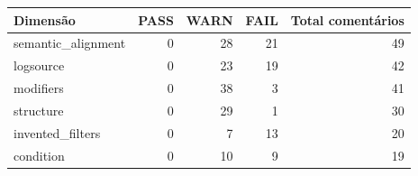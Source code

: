 \begin{tabular}{lrrrr}
\toprule
Dimensão & PASS & WARN & FAIL & Total comentários \\
\midrule
semantic\_alignment & 0 & 28 & 21 & 49 \\
logsource & 0 & 23 & 19 & 42 \\
modifiers & 0 & 38 & 3 & 41 \\
structure & 0 & 29 & 1 & 30 \\
invented\_filters & 0 & 7 & 13 & 20 \\
condition & 0 & 10 & 9 & 19 \\
\bottomrule
\end{tabular}
